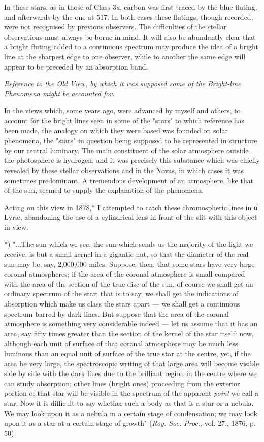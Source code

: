 \documentclass[a4paper, 12pt, oneside, polutonikogreek, english]{article}
\begin{document}
In these stars, as in those of Class 3\emph{a}, carbon was first traced by the blue fluting, and afterwards by the one at 517. In both cases these flutings, though recorded, were not recognised by previous observers. The difficulties of the stellar observations must always be borne in mind. It will also be abundantly clear that a bright fluting added to a continuous spectrum may produce the idea of a bright line at the sharpest edge to one observer, while to another the same edge will appear to be preceded by an absorption band.

\emph{Reference to the Old View, by which it was supposed some of the Bright-line Phenomena might be accounted for.}

In the views which, some years ago, were advanced by myself and others, to account for the bright lines seen in some of the "stars" to which reference has been made, the analogy on which they were based was founded on solar phenomena, the "stars" in question being supposed to be represented in structure by our central luminary. The main constituent of the solar atmosphere outside the photosphere is hydrogen, and it was precisely this substance which was chiefly revealed by these stellar observations and in the Novas, in which cases it was sometimes predominant. A tremendous development of an atmosphere, like that of the sun, seemed to supply the explanation of the phenomena.

Acting on this view in 1878,* I attempted to catch these chromospheric lines in α Lyræ, abandoning the use of a cylindrical lens in front of the slit with this object in view.

*) "...The sun which we see, the sun which sends us the majority of the light we receive, is but a small kernel in a gigantic nut, so that the diameter of the real sun may be, say, 2,000,000 miles. Suppose, then, that some stars have very large coronal atmospheres; if the area of the coronal atmosphere is small compared with the area of the section of the true disc of the sun, of course we shall get an ordinary spectrum of the star; that is to say, we shall get the indications of absorption which make us class the stars apart --- we shall get a continuous spectrum barred by dark lines. But suppose that the area of the coronal atmosphere is something very considerable indeed --- let us assume that it has an area, say fifty times greater than the section of the kernel of the star itself: now, although each unit of surface of that coronal atmosphere may be much less luminous than an equal unit of surface of the true star at the centre, yet, if the area be very large, the spectroscopic writing of that large area will become visible side by side with the dark lines due to the brilliant region in the centre where we can study absorption; other lines (bright ones) proceeding from the exterior portion of that star will be visible in the spectrum of the apparent \emph{point} we call a star. Now it is difficult to say whether such a body as that is a star or a nebula. We may look upon it as a nebula in a certain stage of condensation; we may look upon it as a star at a certain stage of growth" (\emph{Roy. Soc. Proc.}, vol. 27., 1876, p. 50).
\end{document}
